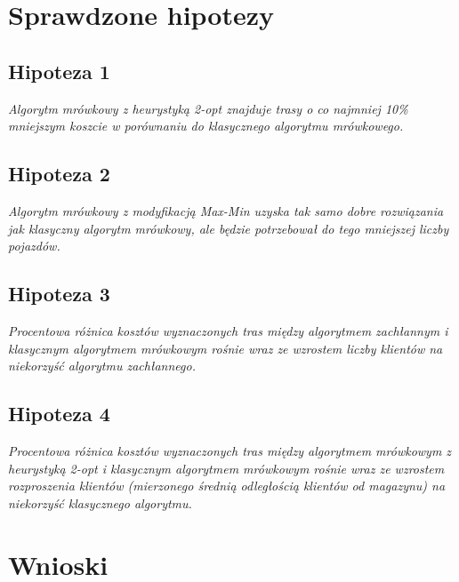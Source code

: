\documentclass{article}
\begin{document}
\section{Sprawdzone hipotezy}

\subsection{Hipoteza 1}
\textit{Algorytm mrówkowy z heurystyką 2-opt znajduje trasy o co najmniej 10\% mniejszym koszcie w porównaniu do klasycznego algorytmu mrówkowego.}

\subsection{Hipoteza 2}
\textit{Algorytm mrówkowy z modyfikacją Max-Min uzyska tak samo dobre rozwiązania jak klasyczny algorytm mrówkowy, ale będzie potrzebował do tego mniejszej liczby pojazdów.}

\subsection{Hipoteza 3}
\textit{Procentowa różnica kosztów wyznaczonych tras między algorytmem zachłannym i klasycznym algorytmem mrówkowym rośnie wraz ze wzrostem liczby klientów na niekorzyść algorytmu zachłannego.}

\subsection{Hipoteza 4}
\textit{Procentowa różnica kosztów wyznaczonych tras między algorytmem mrówkowym z heurystyką 2-opt i klasycznym algorytmem mrówkowym rośnie wraz ze wzrostem rozproszenia klientów (mierzonego średnią odległością klientów od magazynu) na niekorzyść klasycznego algorytmu.}

\section{Wnioski}


\nocite{*}


\end{document}

